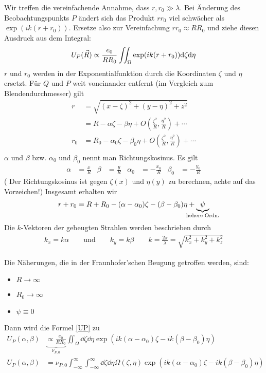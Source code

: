 Wir treffen die vereinfachende Annahme, dass $r, r_0\gg\lambda$.
Bei Änderung des Beobachtungspunkts $P$ ändert sich das Produkt $rr_0$
viel schwächer als $\exp(ik(r+r_0))$. Ersetze also zur Vereinfachung
$rr_0\approx RR_0$ und ziehe diesen Ausdruck aus dem Integral:
\begin{gather*}
  U_P(\vec{R}) \propto \frac{e_0}{RR_0} \iint_{\Omega} 
  \exp(ik(r+r_0)) \mathrm{d}\zeta\mathrm{d}\eta  
  \label{UP}
\end{gather*}
$r$ und $r_0$ werden in der Exponentialfunktion durch die Koordinaten
$\zeta$ und $\eta$ ersetzt.
Für $Q$ und $P$ weit voneinander entfernt (im Vergleich zum
Blendendurchmesser) gilt
\begin{align*}
  r &= \sqrt{(x-\zeta)^2+(y-\eta)^2+z^2} \\
    &= R-\alpha\zeta - \beta\eta 
      + O\left(\frac{\zeta^2}{R},\frac{\eta^2}{R}\right)
      + \dotsb \\
  r_0 &= R_0-\alpha_0\zeta - \beta_0\eta 
        + O\left(\frac{\zeta^2}{R},\frac{\eta^2}{R}\right)
      + \dotsb \\
\end{align*}
$\alpha$ und $\beta$ bzw. $\alpha_0$ und $\beta_0$ nennt man
Richtungskosinus. Es gilt
\begin{align*}
  \alpha &= \frac{x}{R}
  &\beta &= \frac{y}{R}
  &\alpha_0 &= -\frac{x_0}{R}
&\beta_0 &= -\frac{y_0}{R}
\end{align*}
( Der Richtungskosinus ist gegen $\zeta(x)$ und $\eta(y)$ zu
berechnen, achte auf das Vorzeichen!)
Insgesamt erhalten wir
\begin{align*}
  r+r_0 = R+R_0 - (\alpha-\alpha_0)\zeta - (\beta-\beta_0)\eta 
  + \underbrace{\psi}_{\mathclap{\text{höhere Ordn.}}}
\end{align*}
Die $k$-Vektoren der gebeugten Strahlen werden beschrieben durch
\begin{align*}
  k_x = k\alpha \qquad \text{und}\qquad k_y = k\beta
  \qquad k=\frac{2\pi}{\lambda}=\sqrt{k_x^2+k_y^2+k_z^2}
\end{align*}

Die Näherungen, die in der Fraunhofer'schen Beugung getroffen werden,
sind:
\begin{itemize}
\item $R\rightarrow\infty$
\item $R_0\rightarrow\infty$
\item $\psi\equiv 0$
\end{itemize}
Dann wird die Formel \eqref{UP} zu
\begin{align*}
  U_P(\alpha,\beta) 
  & \underbrace{\propto \frac{e_0}{RR_0}}_{\nu_{P,0}} 
    \iint_{\Omega} \dd\zeta\dd\eta
    \exp\left( ik(\alpha-\alpha_0)\zeta - ik(\beta-\beta_0)\eta \right)\\
  U_P(\alpha,\beta) 
  &= \nu_{P,0} \int_{-\infty}^{\infty}\int_{-\infty}^{\infty}
    \dd\zeta\dd\eta \Omega(\zeta,\eta)
  \exp\left( ik(\alpha-\alpha_0)\zeta - ik(\beta-\beta_0)\eta \right)
\end{align*}


